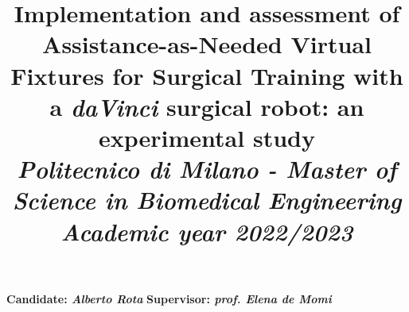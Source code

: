 \documentclass{article}
\title{\textbf{Implementation and assessment of Assistance-as-Needed Virtual Fixtures for Surgical Training with a \textit{daVinci} surgical robot: an experimental study}
\\
\vspace{0.5cm}\large{\textit{Politecnico di Milano - Master of Science in Biomedical Engineering}}
\\
\vspace{0.5cm}\textit{\small{Academic year 2022/2023}}}
\author{}
\date{}
\begin{document}
\maketitle
{\large\noindent \textbf{Candidate: \textit{Alberto Rota}}\newline
\textbf{Supervisor: \textit{prof. Elena de Momi}}}
\vspace{1cm}






% 
% 
\end{document}
